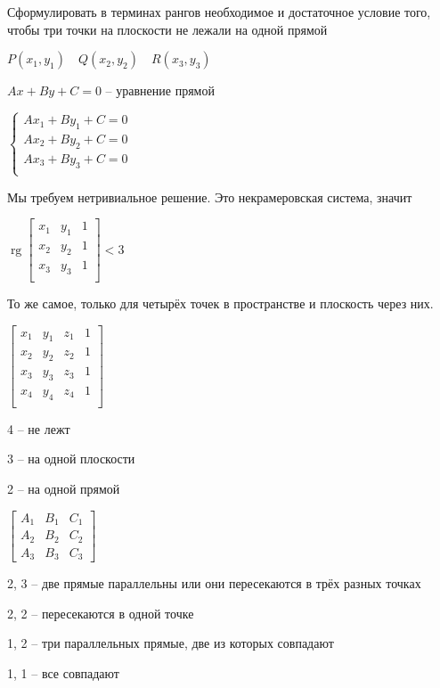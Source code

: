 \documentclass{book}
\DeclareMathOperator{\rg}{rg}
\theoremstyle{definition}
\begin{document}
\begin{problem}
    Сформулировать в терминах рангов необходимое и достаточное условие того, чтобы три точки на плоскости не лежали на одной прямой

    $P(x_1, y_1)\quad Q(x_2, y_2)\quad R\left( x_3, y_3 \right) $

    $Ax+By+C = 0$ -- уравнение прямой

    $\begin{cases}
        Ax_1+By_1+C = 0\\
        Ax_2+By_2+C = 0\\
        Ax_3+By_3+C = 0\\
    \end{cases}$ 

    Мы требуем нетривиальное решение. Это некрамеровская система, значит

    $\rg \begin{bmatrix} x_1&y_1&1\\x_2&y_2&1\\x_3&y_3&1\\ \end{bmatrix} <3$
\end{problem}

\begin{problem}
    То же самое, только для четырёх точек в пространстве и плоскость через них.

    $\begin{bmatrix} x_1&y_1&z_1&1\\ x_2&y_2&z_2&1\\x_3&y_3&z_3&1\\ x_4&y_4&z_4&1\\  \end{bmatrix} $

    4 -- не лежт

    3 -- на одной плоскости

    2 -- на одной прямой
\end{problem}

\begin{problem}
$\left[\begin{array}{cc|c} A_1&B_1&C_1\\A_2&B_2&C_2\\A_3&B_3&C_3 \end{array}\right] $ 


    2, 3 -- две прямые параллельны или они пересекаются в трёх разных точках

    2, 2 -- пересекаются в одной точке

    1, 2 -- три параллельных прямые, две из которых совпадают

    1, 1 -- все совпадают
\end{problem}
\end{document}
